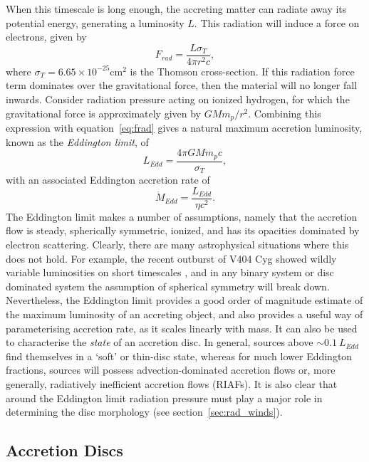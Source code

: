 When this timescale is long enough, the accreting matter
can radiate away its potential energy, generating a luminosity $L$. 
This radiation will induce a force on electrons, given by
\begin{equation}
F_{rad} = \frac{L \sigma_T}{4 \pi r^2 c},
\label{eq:frad}
\end{equation} 
where $\sigma_T = 6.65\times10^{-25}$cm$^2$ is the Thomson cross-section.
If this radiation force term dominates over the gravitational
force, then the material will no longer fall inwards. Consider
radiation pressure acting on ionized hydrogen, for which the gravitational
force is approximately given by $G M m_p / r^2$. Combining this expression
with equation~\ref{eq:frad} gives a natural
maximum accretion luminosity, known as the {\em Eddington limit}, of
\begin{equation}
L_{Edd} = \frac{4 \pi G M m_p c}{\sigma_T},
\label{eq:bondi}
\end{equation} 
with an associated Eddington accretion rate of 
\begin{equation}
\dot{M}_{Edd} = \frac{L_{Edd}}{\eta c^2}.
\label{eq:bondi}
\end{equation} 
The Eddington limit makes a number of assumptions, namely
that the accretion flow is steady, spherically symmetric, ionized,
and has its opacities dominated by electron scattering.
Clearly, there are many astrophysical situations where this does not hold.
For example, the recent outburst of V404 Cyg showed wildly variable
luminosities on short timescales 
\citep[see, e.g.,][among many, many ATels]{kuulkers_atel2015,motta_atel2015}, 
and in any binary system
or disc dominated system the assumption of spherical symmetry will
break down. Nevertheless, the Eddington limit provides a good order of magnitude 
estimate of the maximum luminosity of an accreting object,
and also provides a useful way of parameterising accretion rate,
as it scales linearly with mass. It can also be used
to characterise the {\em state} of an accretion disc.  
In general, sources above $\sim 0.1~L_{Edd}$ find themselves in a 
`soft' or thin-disc state, whereas for much lower Eddington 
fractions, sources will possess advection-dominated accretion flows
\citep[ADAFs; ][]{narayan1994,narayan1995} or, more generally, 
radiatively inefficient accretion flows (RIAFs).
It is also clear that around the Eddington limit radiation pressure
must play a major role in determining the disc morphology 
(see section~\ref{sec:rad_winds}).

\subsection{Accretion Discs}

